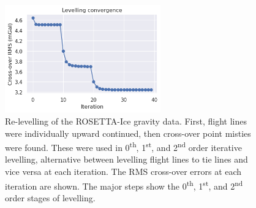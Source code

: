 \begin{figure}[!ht]
    \centering
    \includegraphics[width=0.6\textwidth]{figures/chp4/ROSETTA_levelling_convergence.png}
    \caption[Re-levelling of the ROSETTA-Ice gravity data]{Re-levelling of the ROSETTA-Ice gravity data. First, flight lines were individually upward continued, then cross-over point misties were found. These were used in 0\textsuperscript{th}, 1\textsuperscript{st}, and 2\textsuperscript{nd} order iterative levelling, alternative between levelling flight lines to tie lines and vice versa at each iteration. The RMS cross-over errors at each iteration are shown. The major steps show the 0\textsuperscript{th}, 1\textsuperscript{st}, and 2\textsuperscript{nd} order stages of levelling.}
    \label{fig:chp4_levelling}
\end{figure}

